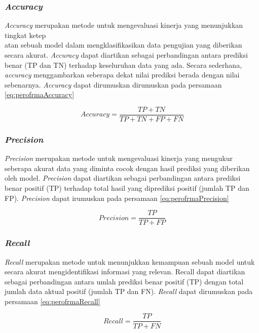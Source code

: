 \subsubsection{\textit{Accuracy}}
\textit{Accuracy} merupakan metode untuk mengevaluasi kinerja yang menunjukkan tingkat ketep\\atan sebuah model dalam mengklasifikasikan data pengujian yang diberikan secara akurat. \textit{Accuracy} dapat diartikan sebagai perbandingan antara prediksi benar (TP dan TN) terhadap keseluruhan data yang ada. Secara sederhana, \textit{accuracy} menggambarkan seberapa dekat nilai prediksi berada dengan nilai sebenarnya. \textit{Accuracy} dapat dirumuskan dirumuskan pada persamaan \ref{eq:perofrmaAccuracy} \parencite{OvalleMagallanes2020}
   
\begin{equation}
    \label{eq:perofrmaAccuracy}
    Accuracy = \frac{TP + TN}{TP + TN + FP + FN}
\end{equation}

\subsubsection{\textit{Precision}}
\textit{Precision} merupakan metode untuk mengevaluasi kinerja yang mengukur seberapa akurat data yang diminta cocok dengan hasil prediksi yang diberikan oleh model. \textit{Precision} dapat diartikan sebagai perbandingan antara prediksi benar positif (TP) terhadap total hasil yang diprediksi positif (jumlah TP dan FP). \textit{Precision} dapat irumuskan pada persamaan \ref{eq:perofrmaPrecision} \parencite{OvalleMagallanes2020}

\begin{equation}
    \label{eq:perofrmaPrecision}
    Precision = \frac{TP}{TP + FP}
\end{equation}

\subsubsection{\textit{Recall}}
\textit{Recall} merupakan metode untuk menunjukkan kemampuan sebuah model untuk secara akurat mengidentifikasi informasi yang relevan. Recall dapat diartikan sebagai perbandingan antara umlah prediksi benar positif (TP) dengan total jumlah data aktual positif (jumlah TP dan FN). \textit{Recall} dapat dirumuskan pada persamaan \ref{eq:perofrmaRecall} \parencite{OvalleMagallanes2020}

\begin{equation}
    \label{eq:perofrmaRecall}
    Recall = \frac{TP}{TP + FN}
\end{equation}

